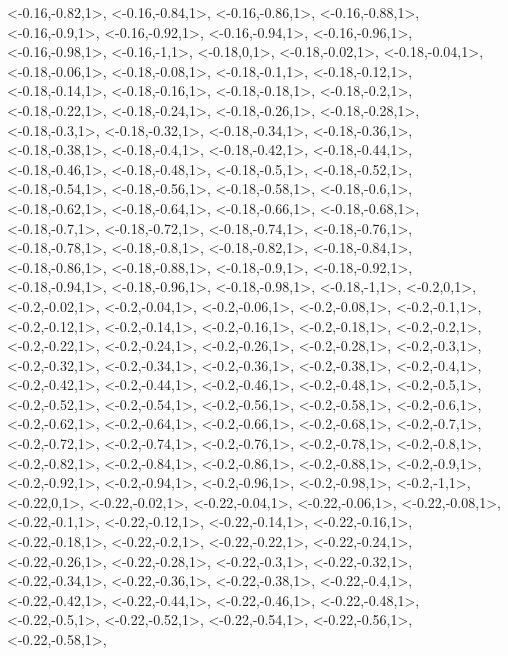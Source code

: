 \documentclass[a4paper,10pt]{article}
\begin{document}
\begin{eulernotebook}
\begin{euleroutput}
  <-0.16,-0.82,1>,
  <-0.16,-0.84,1>,
  <-0.16,-0.86,1>,
  <-0.16,-0.88,1>,
  <-0.16,-0.9,1>,
  <-0.16,-0.92,1>,
  <-0.16,-0.94,1>,
  <-0.16,-0.96,1>,
  <-0.16,-0.98,1>,
  <-0.16,-1,1>,
  <-0.18,0,1>,
  <-0.18,-0.02,1>,
  <-0.18,-0.04,1>,
  <-0.18,-0.06,1>,
  <-0.18,-0.08,1>,
  <-0.18,-0.1,1>,
  <-0.18,-0.12,1>,
  <-0.18,-0.14,1>,
  <-0.18,-0.16,1>,
  <-0.18,-0.18,1>,
  <-0.18,-0.2,1>,
  <-0.18,-0.22,1>,
  <-0.18,-0.24,1>,
  <-0.18,-0.26,1>,
  <-0.18,-0.28,1>,
  <-0.18,-0.3,1>,
  <-0.18,-0.32,1>,
  <-0.18,-0.34,1>,
  <-0.18,-0.36,1>,
  <-0.18,-0.38,1>,
  <-0.18,-0.4,1>,
  <-0.18,-0.42,1>,
  <-0.18,-0.44,1>,
  <-0.18,-0.46,1>,
  <-0.18,-0.48,1>,
  <-0.18,-0.5,1>,
  <-0.18,-0.52,1>,
  <-0.18,-0.54,1>,
  <-0.18,-0.56,1>,
  <-0.18,-0.58,1>,
  <-0.18,-0.6,1>,
  <-0.18,-0.62,1>,
  <-0.18,-0.64,1>,
  <-0.18,-0.66,1>,
  <-0.18,-0.68,1>,
  <-0.18,-0.7,1>,
  <-0.18,-0.72,1>,
  <-0.18,-0.74,1>,
  <-0.18,-0.76,1>,
  <-0.18,-0.78,1>,
  <-0.18,-0.8,1>,
  <-0.18,-0.82,1>,
  <-0.18,-0.84,1>,
  <-0.18,-0.86,1>,
  <-0.18,-0.88,1>,
  <-0.18,-0.9,1>,
  <-0.18,-0.92,1>,
  <-0.18,-0.94,1>,
  <-0.18,-0.96,1>,
  <-0.18,-0.98,1>,
  <-0.18,-1,1>,
  <-0.2,0,1>,
  <-0.2,-0.02,1>,
  <-0.2,-0.04,1>,
  <-0.2,-0.06,1>,
  <-0.2,-0.08,1>,
  <-0.2,-0.1,1>,
  <-0.2,-0.12,1>,
  <-0.2,-0.14,1>,
  <-0.2,-0.16,1>,
  <-0.2,-0.18,1>,
  <-0.2,-0.2,1>,
  <-0.2,-0.22,1>,
  <-0.2,-0.24,1>,
  <-0.2,-0.26,1>,
  <-0.2,-0.28,1>,
  <-0.2,-0.3,1>,
  <-0.2,-0.32,1>,
  <-0.2,-0.34,1>,
  <-0.2,-0.36,1>,
  <-0.2,-0.38,1>,
  <-0.2,-0.4,1>,
  <-0.2,-0.42,1>,
  <-0.2,-0.44,1>,
  <-0.2,-0.46,1>,
  <-0.2,-0.48,1>,
  <-0.2,-0.5,1>,
  <-0.2,-0.52,1>,
  <-0.2,-0.54,1>,
  <-0.2,-0.56,1>,
  <-0.2,-0.58,1>,
  <-0.2,-0.6,1>,
  <-0.2,-0.62,1>,
  <-0.2,-0.64,1>,
  <-0.2,-0.66,1>,
  <-0.2,-0.68,1>,
  <-0.2,-0.7,1>,
  <-0.2,-0.72,1>,
  <-0.2,-0.74,1>,
  <-0.2,-0.76,1>,
  <-0.2,-0.78,1>,
  <-0.2,-0.8,1>,
  <-0.2,-0.82,1>,
  <-0.2,-0.84,1>,
  <-0.2,-0.86,1>,
  <-0.2,-0.88,1>,
  <-0.2,-0.9,1>,
  <-0.2,-0.92,1>,
  <-0.2,-0.94,1>,
  <-0.2,-0.96,1>,
  <-0.2,-0.98,1>,
  <-0.2,-1,1>,
  <-0.22,0,1>,
  <-0.22,-0.02,1>,
  <-0.22,-0.04,1>,
  <-0.22,-0.06,1>,
  <-0.22,-0.08,1>,
  <-0.22,-0.1,1>,
  <-0.22,-0.12,1>,
  <-0.22,-0.14,1>,
  <-0.22,-0.16,1>,
  <-0.22,-0.18,1>,
  <-0.22,-0.2,1>,
  <-0.22,-0.22,1>,
  <-0.22,-0.24,1>,
  <-0.22,-0.26,1>,
  <-0.22,-0.28,1>,
  <-0.22,-0.3,1>,
  <-0.22,-0.32,1>,
  <-0.22,-0.34,1>,
  <-0.22,-0.36,1>,
  <-0.22,-0.38,1>,
  <-0.22,-0.4,1>,
  <-0.22,-0.42,1>,
  <-0.22,-0.44,1>,
  <-0.22,-0.46,1>,
  <-0.22,-0.48,1>,
  <-0.22,-0.5,1>,
  <-0.22,-0.52,1>,
  <-0.22,-0.54,1>,
  <-0.22,-0.56,1>,
  <-0.22,-0.58,1>,

\end{euleroutput}
\end{eulernotebook}
\end{document}
